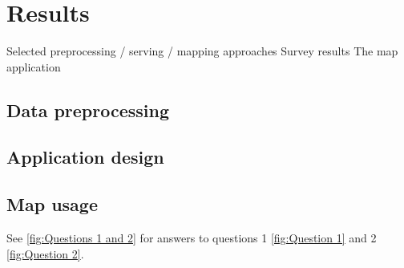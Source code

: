 \section{Results}
Selected preprocessing / serving / mapping approaches
Survey results
The map application

\subsection{Data preprocessing}

\subsection{Application design}

\subsection{Map usage}

See \ref{fig:Questions 1 and 2} for answers to questions 1 \ref{fig:Question 1} and 2 \ref{fig:Question 2}.

